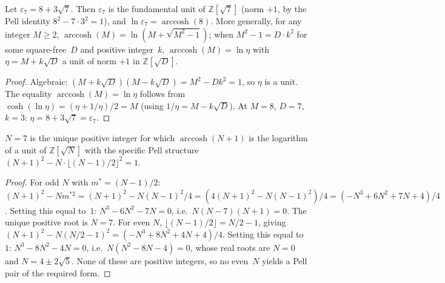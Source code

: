 \begin{lemma}
\label{lem:pell-regulator}
Let $\varepsilon_7 = 8 + 3\sqrt{7}$.
Then $\varepsilon_7$ is the fundamental unit of $\mathbb{Z}[\sqrt{7}]$
(norm $+1$, by the Pell identity $8^2 - 7\cdot 3^2 = 1$),
and $\ln\varepsilon_7 = \operatorname{arccosh}(8)$.
More generally, for any integer $M \ge 2$,
$\operatorname{arccosh}(M) = \ln(M + \sqrt{M^2{-}1})$;
when $M^2 - 1 = D\cdot k^2$ for some square-free~$D$ and
positive integer~$k$, $\operatorname{arccosh}(M) = \ln\eta$
with $\eta = M + k\sqrt{D}$ a unit of norm $+1$ in $\mathbb{Z}[\sqrt{D}]$.
\end{lemma}
\begin{proof}
Algebraic: $(M + k\sqrt{D})(M - k\sqrt{D}) = M^2 - Dk^2 = 1$,
so $\eta$ is a unit.
The equality $\operatorname{arccosh}(M) = \ln\eta$ follows from
$\cosh(\ln\eta) = (\eta + 1/\eta)/2 = M$ (using $1/\eta = M - k\sqrt{D}$).
At $M = 8$, $D = 7$, $k = 3$: $\eta = 8 + 3\sqrt{7} = \varepsilon_7$.
\end{proof}

\begin{proposition}[Pell uniqueness at $N = 7$]
\label{prop:pell-unique}
$N = 7$ is the unique positive integer for which
$\operatorname{arccosh}(N{+}1)$ is the logarithm of a unit
of $\mathbb{Z}[\sqrt{N}]$ with the specific Pell structure
$(N{+}1)^2 - N\cdot\lfloor(N{-}1)/2\rfloor^2 = 1$.
\end{proposition}
\begin{proof}
For odd $N$ with $m^* = (N{-}1)/2$:
$(N{+}1)^2 - N m^{*2}
= (N{+}1)^2 - N(N{-}1)^2/4
= (4(N{+}1)^2 - N(N{-}1)^2)/4
= (-N^3{+}6N^2{+}7N{+}4)/4$.
Setting this equal to~$1$: $N^3 - 6N^2 - 7N = 0$,
i.e.\ $N(N{-}7)(N{+}1) = 0$.
The unique positive root is $N = 7$.
For even $N$, $\lfloor(N{-}1)/2\rfloor = N/2 - 1$, giving
$(N{+}1)^2 - N(N/2{-}1)^2
= (-N^3 + 8N^2 + 4N + 4)/4$.
Setting this equal to~$1$: $N^3 - 8N^2 - 4N = 0$, i.e.\
$N(N^2 - 8N - 4) = 0$, whose real roots are $N = 0$ and
$N = 4 \pm 2\sqrt{5}$.  None of these are positive integers,
so no even~$N$ yields a Pell pair of the required form.
\end{proof}

